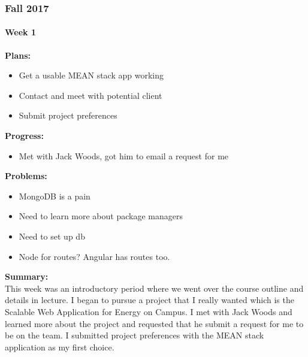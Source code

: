\subsubsection{Fall 2017}
\paragraph{Week 1}
\begin{adjustwidth}{2.5em}{0pt}
    \vspace{-0.5cm}\textbf{Plans:}
    \vspace{-0.5cm}
    \begin{itemize}
        \item Get a usable MEAN stack app working
        \item Contact and meet with potential client
        \item Submit project preferences
    \end{itemize} 
    \vspace{-0.3cm}\textbf{Progress:}
    \vspace{-0.5cm}
    \begin{itemize}
        \item Met with Jack Woods, got him to email a request for me 
    \end{itemize} 
    \vspace{-0.3cm}\textbf{Problems:}
    \vspace{-0.5cm}
    \begin{itemize}
        \item MongoDB is a pain
        \item Need to learn more about package managers
        \item Need to set up db
        \item Node for routes? Angular has routes too.
    \end{itemize}  
    \vspace{-0.3cm}\noindent\textbf{Summary:}\\
    \noindent This week was an introductory period where we went over the course outline and details in lecture.
    I began to pursue a project that I really wanted which is the Scalable Web Application for Energy on Campus.
    I met with Jack Woods and learned more about the project and requested that he submit a request for me to be on the team.
    I submitted project preferences with the MEAN stack application as my first choice.
\end{adjustwidth}
